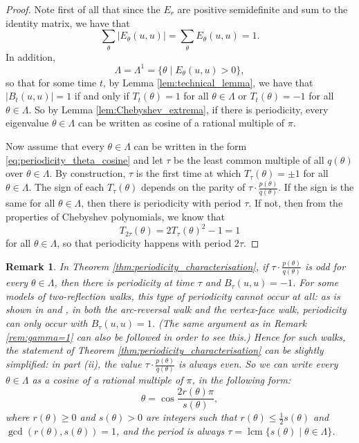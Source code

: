 \documentclass{article}
\newtheorem{remark}[theorem]{Remark}
\numberwithin{equation}{section}
\DeclareMathOperator{\lcm}{lcm}
\begin{document}
\begin{proof}
Note first of all that since the $E_r$ are positive semidefinite and sum to the identity matrix, we have that
\[
\sum_{\theta} |E_\theta(u,u)| = \sum_{\theta} E_\theta(u,u) = 1.
\]
In addition,
\[
\Lambda = \Lambda^1 = \{\theta \mid E_\theta(u,u) > 0\},
\]
so that for some time $t$, by Lemma \ref{lem:technical_lemma}, we have that $|B_t(u,u)| = 1$ if and only if $T_t(\theta) = 1$ for all $\theta \in \Lambda$ or $T_t(\theta) = -1$ for all $\theta \in \Lambda$. So by Lemma \ref{lem:Chebyshev_extrema}, if there is periodicity, every eigenvalue $\theta \in \Lambda$ can be written as cosine of a rational multiple of $\pi$.

Now assume that every $\theta \in \Lambda$ can be written in the form \eqref{eq:periodicity_theta_cosine} and let $\tau$ be the least common multiple of all $q(\theta)$ over $\theta \in \Lambda$. By construction, $\tau$ is the first time at which $T_\tau(\theta) = \pm 1$ for all $\theta \in \Lambda$. The sign of each $T_\tau(\theta)$ depends on the parity of $\tau \cdot \frac{p(\theta)}{q(\theta)}$. If the sign is the same for all $\theta \in \Lambda$, then there is periodicity with period $\tau$. If not, then from the properties of Chebyshev polynomials, we know that
\[
T_{2\tau}(\theta) = 2T_\tau(\theta)^2 - 1 = 1
\]
for all $\theta \in \Lambda$, so that periodicity happens with period $2\tau$.
\end{proof}

\begin{remark}
\label{rem:periodicity_char_simplified}
In Theorem \ref{thm:periodicity_characterisation}, if $\tau \cdot \frac{p(\theta)}{q(\theta)}$ is odd for every $\theta \in \Lambda$, then there is periodicity at time $\tau$ and $B_\tau(u,u) = -1$. For some models of two-reflection walks, this type of periodicity cannot occur at all: as is shown in \cite{GodZha2023} and \cite{GuoSch2024}, in both the arc-reversal walk and the vertex-face walk, periodicity can only occur with $B_\tau(u,u) = 1$. (The same argument as in Remark \ref{rem:gamma=1} can also be followed in order to see this.) Hence for such walks, the statement of Theorem \ref{thm:periodicity_characterisation} can be slightly simplified: in part (ii), the value $\tau \cdot \frac{p(\theta)}{q(\theta)}$ is always even. So we can write every $\theta \in \Lambda$ as a cosine of a rational multiple of $\pi$, in the following form:
\[
\theta = \cos\frac{2r(\theta) \pi}{s(\theta)},
\]
where $r(\theta) \geq 0$ and $s(\theta) > 0$ are integers such that $r(\theta) \leq \frac{1}{2}s(\theta)$ and $\gcd(r(\theta),s(\theta)) = 1$, and the period is always $\tau = \lcm\{s(\theta) \mid \theta \in \Lambda\}$.
\end{remark}
\end{document}
